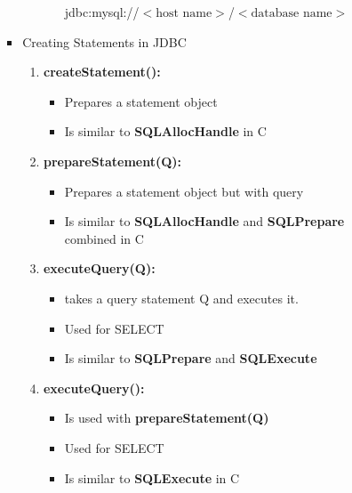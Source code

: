 \documentclass[12pt]{article}
\begin{document}
\begin{enumerate}[1.]
\begin{enumerate}[a)]
\begin{itemize}
\begin{itemize}
\begin{enumerate}[1.]
\begin{itemize}
                        \bigskip

                        jdbc:mysql://$<\text{host name}>$/$<\text{database name}>$

                        \bigskip
                    \end{itemize}

                \end{enumerate}
                \item Creating Statements in JDBC

                \begin{enumerate}[1.]
                    \item \textbf{createStatement():}
                    \begin{itemize}
                        \item Prepares a statement object
                        \item Is similar to \textbf{SQLAllocHandle} in C
                    \end{itemize}
                    \item \textbf{prepareStatement(Q):}
                    \begin{itemize}
                        \item Prepares a statement object but with query
                        \item Is similar to \textbf{SQLAllocHandle} and \textbf{SQLPrepare} combined in C
                    \end{itemize}
                    \item \textbf{executeQuery(Q):}
                    \begin{itemize}
                        \item takes a query statement Q and executes it.
                        \item Used for SELECT
                        \item Is similar to \textbf{SQLPrepare} and \textbf{SQLExecute}
                    \end{itemize}
                    \item \textbf{executeQuery():}
                    \begin{itemize}
                        \item Is used with \textbf{prepareStatement(Q)}
                        \item Used for SELECT
                        \item Is similar to \textbf{SQLExecute} in C

\end{itemize}
\end{enumerate}
\end{itemize}
\end{itemize}
\end{enumerate}
\end{enumerate}
\end{document}
